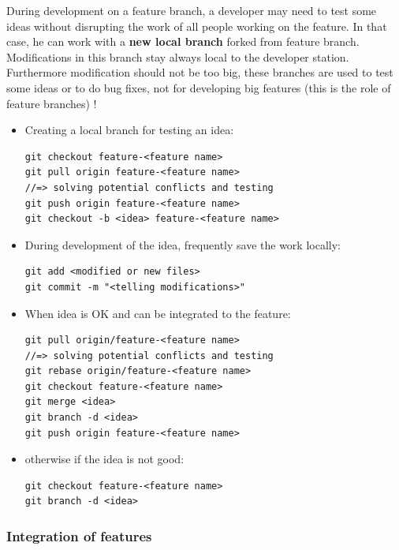 \documentclass[12pt,a4paper]{article}
\begin{document}
During development on a feature branch, a developer may need to test some ideas without disrupting the work of all people working on the feature. In that case, he can work with a \textbf{new local branch} forked from feature branch. Modifications in this branch stay always local to the developer station. Furthermore modification should not be too big, these branches are used to test some ideas or to do bug fixes, not for developing big features (this is the role of feature branches) !
\begin{itemize}
\item Creating a local branch for testing an idea:
\begin{verbatim}
git checkout feature-<feature name>
git pull origin feature-<feature name>
//=> solving potential conflicts and testing
git push origin feature-<feature name>
git checkout -b <idea> feature-<feature name>
\end{verbatim}
\item During development of the idea, frequently save the work locally:
\begin{verbatim}
git add <modified or new files>
git commit -m "<telling modifications>"
\end{verbatim}
\item When idea is OK and can be integrated to the feature:
\begin{verbatim}
git pull origin/feature-<feature name>
//=> solving potential conflicts and testing
git rebase origin/feature-<feature name>
git checkout feature-<feature name>
git merge <idea>
git branch -d <idea>
git push origin feature-<feature name>
\end{verbatim}
\item otherwise if the idea is not good:
\begin{verbatim}
git checkout feature-<feature name>
git branch -d <idea>
\end{verbatim}
\end{itemize}

\subsubsection{Integration of features}
\end{document}
